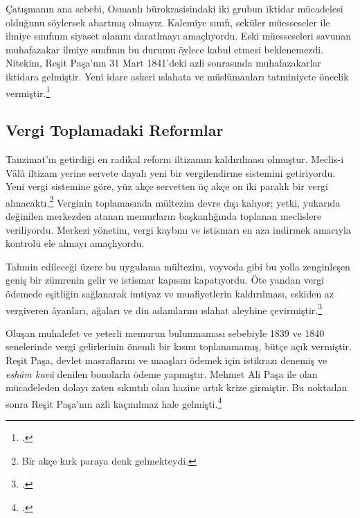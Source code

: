 Çatışmanın ana sebebi, Osmanlı bürokrasisindaki iki grubun iktidar mücadelesi olduğunu söylersek abartmış olmayız. Kalemiye sınıfı, seküler müesseseler ile ilmiye sınıfının siyaset alanını daratlmayı amaçlıyordu. 
Eski müesseseleri savunan muhafazakar ilmiye sınıfının bu durumu öylece kabul etmesi beklenemezdi. Nitekim, Reşit Paşa'nın 31 Mart 1841'deki azli sonrasında muhafazakarlar iktidara gelmiştir. Yeni idare askeri ıslahata ve 
müslümanları tatminiyete öncelik vermiştir.\footcite[185]{tanzimat}

\subsection{Vergi Toplamadaki Reformlar}
\indent\indent Tanzimat'ın getirdiği en radikal reform iltizamın kaldırılması olmuştur. Meclis-i Vâlâ iltizam yerine servete dayalı yeni bir vergilendirme sistemini getiriyordu. Yeni vergi sistemine göre,
yüz akçe servetten üç akçe on iki paralık bir vergi alınacaktı.\footnote{Bir akçe kırk paraya denk gelmekteydi.} Verginin toplamasında mültezim devre dışı kalıyor; yetki, yukarıda değinilen merkezden 
atanan memurların başkanlığında toplanan  meclislere veriliyordu. Merkezi yönetim, vergi kaybını ve istismarı en aza indirmek amacıyla kontrolü ele almayı amaçlıyordu.

Tahmin edileceği üzere bu uygulama mültezim, voyvoda gibi bu yolla zenginleşen geniş bir zümrenin gelir ve istismar kapısını kapatıyordu. Öte yandan vergi ödemede eşitliğin sağlanarak
imtiyaz ve muafiyetlerin kaldırılması, eskiden az vergiveren âyanları, ağaları ve din adamlarını ıslahat aleyhine çevirmiştir.\footcite[180]{tanzimat}

Oluşan muhalefet ve yeterli memurun bulunmaması sebebiyle 1839 ve 1840 senelerinde vergi gelirlerinin önemli bir kısmı toplanamamış, bütçe açık vermiştir. Reşit Paşa, devlet masraflarını ve 
maaşları ödemek için istikrazı denemiş ve \textit{eshâm kavâ} denilen bonolarla ödeme yapmıştır. Mehmet Ali Paşa ile olan mücadeleden dolayı zaten sıkıntılı olan hazine artık krize girmiştir.
Bu noktadan sonra Reşit Paşa'nın azli kaçınılmaz hale gelmişti.\footcite[185]{tanzimat}
